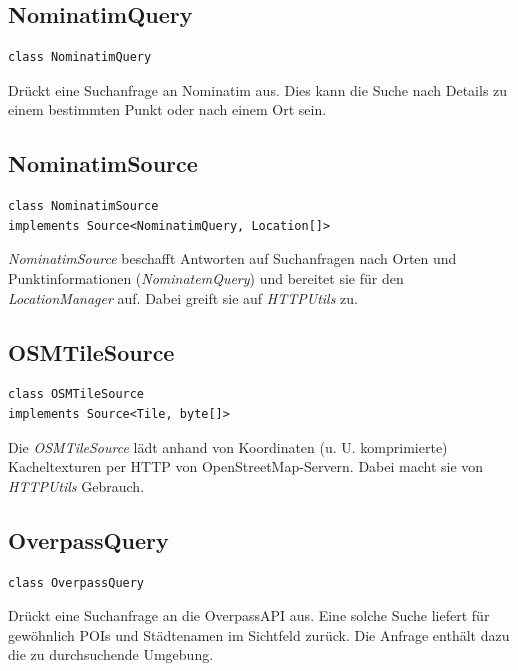 \documentclass[10pt]{scrreprt}
\begin{document}
\vspace{5mm}
\subsection*{NominatimQuery}
\begin{lstlisting}
class NominatimQuery
\end{lstlisting}
Drückt eine Suchanfrage an Nominatim aus. Dies kann die Suche nach Details zu einem bestimmten Punkt oder nach einem Ort sein.\\

\vspace{5mm}
\subsection*{NominatimSource}
\begin{lstlisting}
class NominatimSource
implements Source<NominatimQuery, Location[]>
\end{lstlisting}
\textit{NominatimSource} beschafft Antworten auf Suchanfragen nach Orten und Punktinformationen (\textit{NominatemQuery}) und bereitet sie für den \textit{LocationManager} auf. Dabei greift sie auf \textit{HTTPUtils} zu.\\

\vspace{5mm}
\subsection*{OSMTileSource}
\begin{lstlisting}
class OSMTileSource
implements Source<Tile, byte[]>
\end{lstlisting}
Die \textit{OSMTileSource} lädt anhand von Koordinaten (u. U. komprimierte) Kacheltexturen per HTTP von OpenStreetMap-Servern. Dabei macht sie von \textit{HTTPUtils} Gebrauch.\\

\vspace{5mm}
\subsection*{OverpassQuery}
\begin{lstlisting}
class OverpassQuery
\end{lstlisting}
Drückt eine Suchanfrage an die OverpassAPI aus. Eine solche Suche liefert für gewöhnlich POIs und Städtenamen im Sichtfeld zurück. Die Anfrage enthält dazu die zu durchsuchende Umgebung.\\
\end{document}
